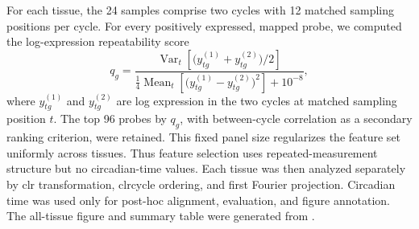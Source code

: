 \documentclass[10pt,twocolumn]{article}
\begin{document}
For each tissue, the 24 samples comprise two cycles with 12 matched sampling
positions per cycle. For every positively expressed, mapped probe, we computed
the log-expression repeatability score
\[
q_g =
\frac{\operatorname{Var}_t\!\left[\bigl(y^{(1)}_{tg}+y^{(2)}_{tg}\bigr)/2\right]}
{\frac{1}{4}\operatorname{Mean}_t\!\left[\bigl(y^{(1)}_{tg}-y^{(2)}_{tg}\bigr)^2\right]+10^{-8}},
\]
where \(y^{(1)}_{tg}\) and \(y^{(2)}_{tg}\) are log expression in the two
cycles at matched sampling position \(t\). The top 96 probes by \(q_g\), with
between-cycle correlation as a secondary ranking criterion, were retained. This
fixed panel size regularizes the feature set uniformly across tissues. Thus
feature selection uses repeated-measurement structure but no circadian-time
values. Each tissue was then analyzed separately by clr transformation, clrcycle
ordering, and first Fourier projection. Circadian time was used only for
post-hoc alignment, evaluation, and figure annotation. The all-tissue figure and
summary table were generated from
.

\clearpage
\balance
\printbibliography
\end{document}
